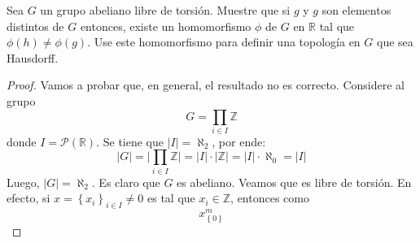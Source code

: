 \documentclass[12pt]{report}
\theoremstyle{largebreak}
\newcommand\abs[1]{\ensuremath{\lvert#1\rvert}}
\begin{document}
    \begin{excer}
        Sea $G$ un grupo abeliano libre de torsión. Muestre que si $g$ y $g$ son elementos distintos de $G$ entonces, existe un homomorfismo $\phi$ de $G$ en $\mathbb{R}$ tal que $\phi(h)\neq\phi(g)$. Use este homomorfismo para definir una topología en $G$ que sea Hausdorff.
    \end{excer}

    \begin{proof}
        Vamos a probar que, en general, el resultado no es correcto. Considere al grupo
        \begin{equation*}
            G=\prod_{ i\in I}\mathbb{Z}
        \end{equation*}
        donde $I=\mathcal{P}\left(\mathbb{R}\right)$. Se tiene que $\abs{I}=\aleph_2$, por ende:
        \begin{equation*}
            \abs{G}=\abs{\prod_{ i\in I}\mathbb{Z}}=\abs{I}\cdot\abs{\mathbb{Z}}=\abs{I}\cdot\aleph_0=\abs{I}
        \end{equation*}
        Luego, $\abs{G}=\aleph_2$. Es claro que $G$ es abeliano. Veamos que es libre de torsión. En efecto, si $x=\left\{x_i \right\}_{ i\in I}\neq0$ es tal que $x_i\in\mathbb{Z}$, entonces como
        \begin{equation*}
            x_{\left\{0 \right\}}^m
        \end{equation*}
    \end{proof}
\end{document}
